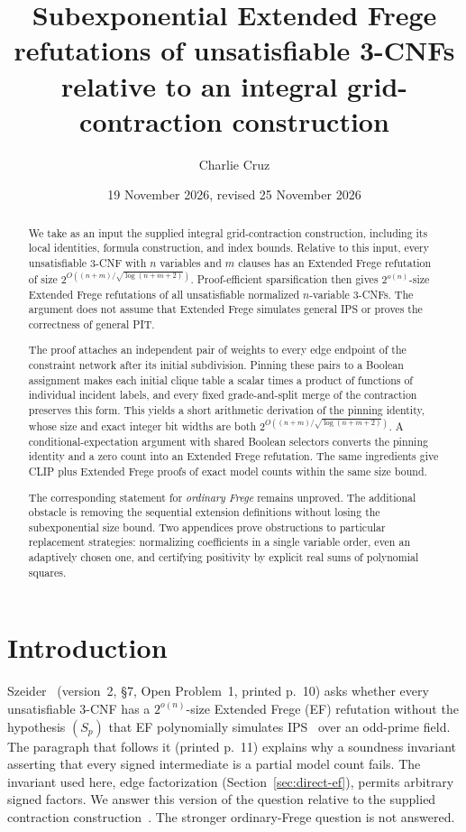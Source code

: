 \documentclass[11pt]{article}
\title{\textbf{Subexponential Extended Frege refutations of unsatisfiable 3-CNFs}\\[0.4em]
\large relative to an integral grid-contraction construction}
\author{Charlie Cruz}
\date{19 November 2026, revised 25 November 2026}
\theoremstyle{definition}
\theoremstyle{remark}
\begin{document}
\maketitle

\begin{abstract}
We take as an input the supplied integral grid-contraction
construction, including its local identities, formula construction,
and index bounds. Relative to this input, every unsatisfiable 3-CNF
with $n$ variables and $m$ clauses has an Extended Frege refutation
of size $2^{O((n+m)/\sqrt{\log(n+m+2)})}$. Proof-efficient
sparsification then gives $2^{o(n)}$-size Extended Frege refutations
of all unsatisfiable normalized $n$-variable 3-CNFs. The argument does
not assume that Extended Frege simulates general IPS or proves the
correctness of general PIT.

The proof attaches an independent pair of weights to every edge
endpoint of the constraint network after its initial subdivision.
Pinning these pairs to a Boolean assignment makes each initial clique
table a scalar times a product of functions of individual incident
labels, and every fixed grade-and-split merge of the contraction
preserves this form. This yields a short arithmetic derivation of the
pinning identity, whose size and exact integer bit widths are both
$2^{O((n+m)/\sqrt{\log(n+m+2)})}$. A conditional-expectation argument
with shared Boolean selectors converts the pinning identity and a zero
count into an Extended Frege refutation. The same ingredients give
CLIP plus Extended Frege proofs of exact model counts within the same
size bound.

The corresponding statement for \emph{ordinary Frege} remains
unproved. The additional obstacle is removing the sequential extension
definitions without losing the subexponential size bound. Two
appendices prove obstructions to particular replacement strategies:
normalizing coefficients in a single variable order, even an
adaptively chosen one, and certifying positivity by explicit real sums
of polynomial squares.
\end{abstract}

\tableofcontents
\bigskip

\section{Introduction}
\label{sec:introduction}

Szeider~\cite{szeider} (version~2, \S7, Open Problem~1, printed
p.~10) asks whether every unsatisfiable 3-CNF has a $2^{o(n)}$-size
Extended Frege (EF) refutation without the hypothesis $(S_p)$ that EF
polynomially simulates IPS~\cite{gp} over an odd-prime field. The paragraph that
follows it (printed p.~11) explains why a soundness invariant asserting
that every signed intermediate is a partial model count fails. The
invariant used here, edge factorization
(Section~\ref{sec:direct-ef}), permits arbitrary signed factors. We
answer this version of the question relative to the supplied
contraction construction~\cite{cruz-ntime}. The stronger
ordinary-Frege question is not answered.
\end{document}
